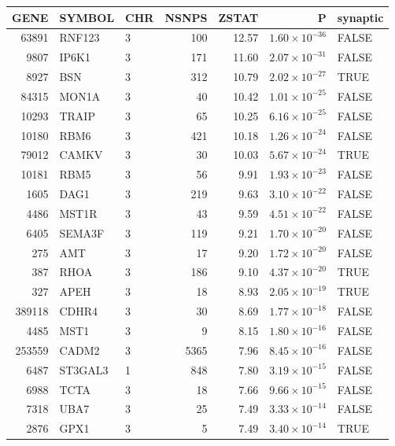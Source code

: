 \begin{table}[ht]
\centering
\begin{adjustbox}{totalheight=10in}
\begin{tabular}{rllrrrl}
  \hline
GENE & SYMBOL & CHR & NSNPS & ZSTAT & P & synaptic \\ 
  \hline
63891 & RNF123 & 3 & 100 & 12.57 & $1.60 \times 10^{-36}$ & FALSE \\ 
  9807 & IP6K1 & 3 & 171 & 11.60 & $2.07 \times 10^{-31}$ & FALSE \\ 
  8927 & BSN & 3 & 312 & 10.79 & $2.02 \times 10^{-27}$ & TRUE \\ 
  84315 & MON1A & 3 &  40 & 10.42 & $1.01 \times 10^{-25}$ & FALSE \\ 
  10293 & TRAIP & 3 &  65 & 10.25 & $6.16 \times 10^{-25}$ & FALSE \\ 
  10180 & RBM6 & 3 & 421 & 10.18 & $1.26 \times 10^{-24}$ & FALSE \\ 
  79012 & CAMKV & 3 &  30 & 10.03 & $5.67 \times 10^{-24}$ & TRUE \\ 
  10181 & RBM5 & 3 &  56 & 9.91 & $1.93 \times 10^{-23}$ & FALSE \\ 
  1605 & DAG1 & 3 & 219 & 9.63 & $3.10 \times 10^{-22}$ & FALSE \\ 
  4486 & MST1R & 3 &  43 & 9.59 & $4.51 \times 10^{-22}$ & FALSE \\ 
  6405 & SEMA3F & 3 & 119 & 9.21 & $1.70 \times 10^{-20}$ & FALSE \\ 
  275 & AMT & 3 &  17 & 9.20 & $1.72 \times 10^{-20}$ & FALSE \\ 
  387 & RHOA & 3 & 186 & 9.10 & $4.37 \times 10^{-20}$ & TRUE \\ 
  327 & APEH & 3 &  18 & 8.93 & $2.05 \times 10^{-19}$ & TRUE \\ 
  389118 & CDHR4 & 3 &  30 & 8.69 & $1.77 \times 10^{-18}$ & FALSE \\ 
  4485 & MST1 & 3 &   9 & 8.15 & $1.80 \times 10^{-16}$ & FALSE \\ 
  253559 & CADM2 & 3 & 5365 & 7.96 & $8.45 \times 10^{-16}$ & FALSE \\ 
  6487 & ST3GAL3 & 1 & 848 & 7.80 & $3.19 \times 10^{-15}$ & FALSE \\ 
  6988 & TCTA & 3 &  18 & 7.66 & $9.66 \times 10^{-15}$ & FALSE \\ 
  7318 & UBA7 & 3 &  25 & 7.49 & $3.33 \times 10^{-14}$ & FALSE \\ 
  2876 & GPX1 & 3 &   5 & 7.49 & $3.40 \times 10^{-14}$ & TRUE \\ 

\end{tabular}
\end{adjustbox}
\end{table}
